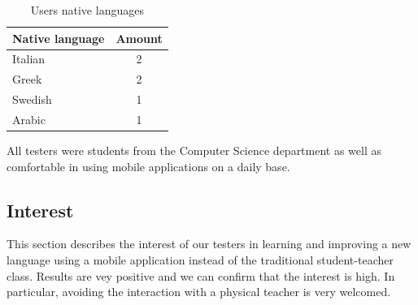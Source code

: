 \begin{table}[!ht]
    \centering
    \begin{tabular}{|l|c|}
        \hline
        \multicolumn{1}{|c|}{\textbf{Native language}} & \textbf{Amount} \\ \hline
        Italian                                        & 2               \\ \hline
        Greek                                          & 2               \\ \hline
        Swedish                                        & 1               \\ \hline
        Arabic                                         & 1               \\ \hline
    \end{tabular}
    \caption{Users native languages}
    \label{table:native_languages}
\end{table}

\noindent All testers were students from the Computer Science department as well as comfortable in using mobile applications on a daily base.

\subsection*{Interest}
\label{sub:Interest}

This section describes the interest of our testers in learning and improving a new language using a mobile application instead of the traditional student-teacher class. Results are vey positive and we can confirm that the interest is high. In particular, avoiding the interaction with a physical teacher is very welcomed.


